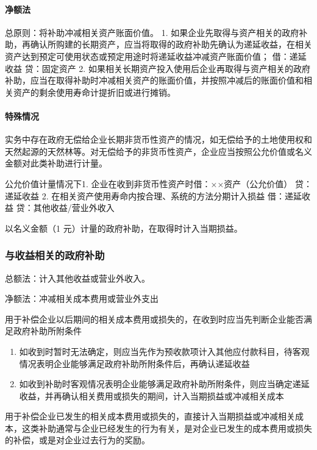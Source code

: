 \documentclass[UTF8,12pt]{ctexart}
\numberwithin{equation}{section} %
\numberwithin{figure}{section}
\numberwithin{table}{section}
\begin{document}
	\paragraph{净额法}
	总原则：将补助冲减相关资产账面价值。
	1.	如果企业先取得与资产相关的政府补助，再确认所购建的长期资产，应当将取得的政府补助先确认为递延收益，在相关资产达到预定可使用状态或预定用途时将递延收益冲减资产账面价值；
	借：递延收益 贷：固定资产
	2.	如果相关长期资产投入使用后企业再取得与资产相关的政府补助，应当在取得补助时冲减相关资产的账面价值，并按照冲减后的账面价值和相关资产的剩余使用寿命计提折旧或进行摊销。
	
	\paragraph{特殊情况}
	实务中存在政府无偿给企业长期非货币性资产的情况，如无偿给予的土地使用权和天然起源的天然林等。对无偿给予的非货币性资产，企业应当按照公允价值或名义金额对此类补助进行计量。
	
	公允价值计量情况下1.	企业在收到非货币性资产时借：××资产（公允价值）
	贷：递延收益
	2.	在相关资产使用寿命内按合理、系统的方法分期计入损益
	借：递延收益
	贷：其他收益/营业外收入
	
	以名义金额（1 元）计量的政府补助，在取得时计入当期损益。
	\subsubsection{与收益相关的政府补助}
	总额法：计入其他收益或营业外收入。
	
	净额法：冲减相关成本费用或营业外支出
	
	用于补偿企业以后期间的相关成本费用或损失的，在收到时应当先判断企业能否满足政府补助所附条件
	\begin{enumerate}
		\item 如收到时暂时无法确定，则应当先作为预收款项计入其他应付款科目，待客观情况表明企业能够满足政府补助所附条件后，再确认递延收益
		
		\item 如收到补助时客观情况表明企业能够满足政府补助所附条件，则应当确定递延收益，并再确认相关费用或损失的期间，计入当期损益或冲减相关成本
		
	\end{enumerate}
	
	用于补偿企业已发生的相关成本费用或损失的，直接计入当期损益或冲减相关成本，这类补助通常与企业已经发生的行为有关，是对企业已发生的成本费用或损失的补偿，或是对企业过去行为的奖励。
	
\end{document}
